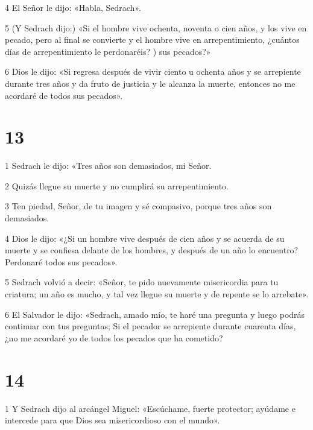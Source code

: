 \par 4 El Señor le dijo: «Habla, Sedrach».

\par 5 (Y Sedrach dijo:) «Si el hombre vive ochenta, noventa o cien años, y los vive en pecado, pero al final se convierte y el hombre vive en arrepentimiento, ¿cuántos días de arrepentimiento le perdonaréis? ) sus pecados?»

\par 6 Dios le dijo: «Si regresa después de vivir ciento u ochenta años y se arrepiente durante tres años y da fruto de justicia y le alcanza la muerte, entonces no me acordaré de todos sus pecados».

\chapter{13}

\par 1 Sedrach le dijo: «Tres años son demasiados, mi Señor.

\par 2 Quizás llegue su muerte y no cumplirá su arrepentimiento.

\par 3 Ten piedad, Señor, de tu imagen y sé compasivo, porque tres años son demasiados.

\par 4 Dios le dijo: «¿Si un hombre vive después de cien años y se acuerda de su muerte y se confiesa delante de los hombres, y después de un año lo encuentro? Perdonaré todos sus pecados».

\par 5 Sedrach volvió a decir: «Señor, te pido nuevamente misericordia para tu criatura; un año es mucho, y tal vez llegue su muerte y de repente se lo arrebate».

\par 6 El Salvador le dijo: «Sedrach, amado mío, te haré una pregunta y luego podrás continuar con tus preguntas; Si el pecador se arrepiente durante cuarenta días, ¿no me acordaré yo de todos los pecados que ha cometido?

\chapter{14}

\par 1 Y Sedrach dijo al arcángel Miguel: «Escúchame, fuerte protector; ayúdame e intercede para que Dios sea misericordioso con el mundo».


